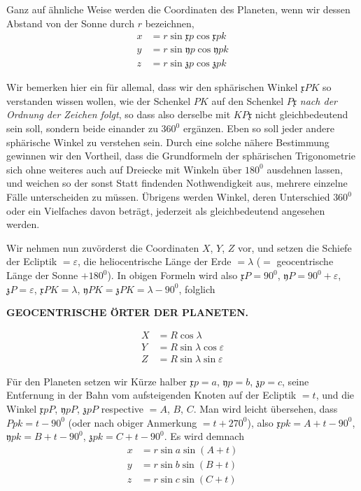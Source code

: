 Ganz auf ähnliche Weise werden die Coordinaten des Planeten, wenn wir
dessen Abstand von der Sonne durch $r$ bezeichnen,
\[
\begin{aligned}
x&=r\sin\mathfrak{x}p\cos\mathfrak{x}pk\\
y&=r\sin\mathfrak{y}p\cos\mathfrak{y}pk\\
z&=r\sin\mathfrak{z}p\cos\mathfrak{z}pk
\end{aligned}
\]

Wir bemerken hier ein für allemal, dass wir den sphärischen Winkel
$\mathfrak{x}PK$ so verstanden wissen wollen, wie der Schenkel $PK$ auf den Schenkel
$P\mathfrak{x}$ \textit{nach der Ordnung der Zeichen folgt}, so dass also derselbe mit $KP\mathfrak{x}$ nicht
gleichbedeutend sein soll, sondern beide einander zu $360^0$ ergänzen. Eben so
soll jeder andere sphärische Winkel zu verstehen sein. Durch eine solche nähere
Bestimmung gewinnen wir den Vortheil, dass die Grundformeln der sphärischen
Trigonometrie sich ohne weiteres auch auf Dreiecke mit Winkeln über
$180^0$ ausdehnen lassen, und weichen so der sonst Statt findenden Nothwendigkeit
aus, mehrere einzelne Fälle unterscheiden zu müssen. Übrigens werden
Winkel, deren Unterschied $360^0$ oder ein Vielfaches davon beträgt, jederzeit
als gleichbedeutend angesehen werden.

Wir nehmen nun zuvörderst die Coordinaten $X$, $Y$, $Z$ vor, und setzen die
Schiefe der Ecliptik $=\varepsilon$, die heliocentrische Länge der Erde $=\lambda$ ($=$ geocentrische
Länge der Sonne $+180^0$). In obigen Formeln wird also $\mathfrak{x}P=90^0$,
$\mathfrak{y}P=90^0+\varepsilon$, $\mathfrak{z}P=\varepsilon$, $\mathfrak{x}PK=\lambda$, $\mathfrak{y}PK=\mathfrak{z}PK=\lambda-90^0$, folglich
\par{}
\par\clearpage
\thispagestyle{empty}
\noindent{}%
%
\parbox[t]{\dimexpr\linewidth-24mm\relax}{\centering\footnotesize\bfseries GEOCENTRISCHE ÖRTER DER PLANETEN.\par}%
\makebox[12mm][r]{}\par\nobreak\medskip
\[
\begin{aligned}
X&=R\cos\lambda\\
Y&=R\sin\lambda\cos\varepsilon\\
Z&=R\sin\lambda\sin\varepsilon
\end{aligned}
\]

Für den Planeten setzen wir Kürze halber $\mathfrak{x}p=a$, $\mathfrak{y}p=b$, $\mathfrak{z}p=c$, seine
Entfernung in der Bahn vom aufsteigenden Knoten auf der Ecliptik $=t$, und
die Winkel $\mathfrak{x}pP$, $\mathfrak{y}pP$, $\mathfrak{z}pP$ respective $=A$, $B$, $C$. Man wird leicht übersehen,
dass $Ppk=t-90^0$ (oder nach obiger Anmerkung $=t+270^0$), also
$\mathfrak{x}pk=A+t-90^0$, $\mathfrak{y}pk=B+t-90^0$, $\mathfrak{z}pk=C+t-90^0$. Es wird demnach
\[
\begin{aligned}
x&=r\sin a\sin(A+t)\\
y&=r\sin b\sin(B+t)\\
z&=r\sin c\sin(C+t)
\end{aligned}
\]

